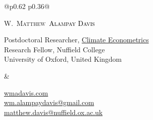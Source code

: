 \documentclass[margin,line]{res}
\newlength{\headerboxheight}
\begin{document}
\begin{center}
  \begin{tabular}{@{}p{0.62\textwidth} p{0.36\textwidth}@{}}
    \begin{minipage}[t][\headerboxheight][t]{\linewidth}
      {\LARGE\scshape%
        {\color{fnamegray}W.\ Matthew}\ \textcolor{black}{Alampay Davis}%
      }\par\vspace{1.2ex}
      \vfill
    {\small
        Postdoctoral Researcher, \href{http://www.climateeconometrics.org/about/}{Climate Econometrics}\\
        Research Fellow, Nuffield College\\
        University of Oxford, United Kingdom
      }
    \end{minipage}
    &
    \begin{minipage}[t][\headerboxheight][t]{\linewidth}
      \vfill
      \begin{flushright}\small
        \href{https://wmadavis.com}{wmadavis.com}\\
        \href{mailto:wm.alampaydavis@gmail.com}{wm.alampaydavis@gmail.com}\\
        \href{mailto:matthew.davis@nuffield.ox.ac.uk}{matthew.davis@nuffield.ox.ac.uk}

\end{flushright}
\end{minipage}
\end{tabular}
\end{center}
\end{document}
